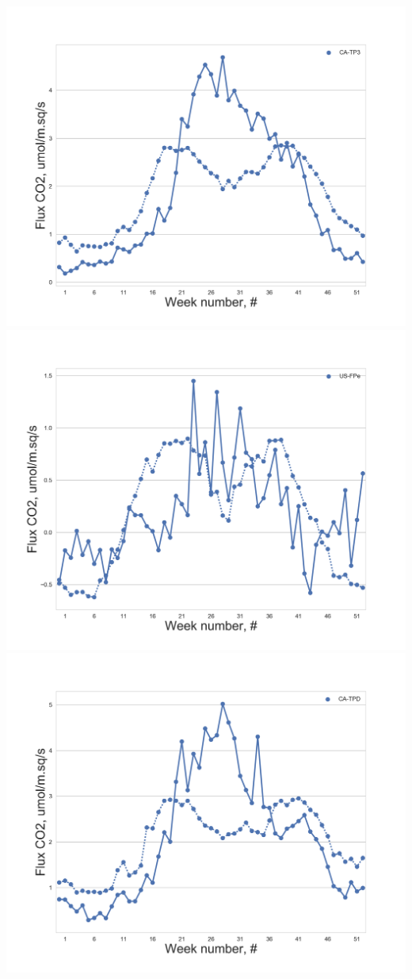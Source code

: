 \documentclass{beamer}
\begin{document}
\begin{frame}
\begin{columns}[t]
\centering
\includegraphics[width=\textwidth]{Reverse_engin_only_T/20.png}\\
\includegraphics[width=\textwidth]{Reverse_engin_only_T/23.png}
\centering
\includegraphics[width=\textwidth]{Reverse_engin_only_T/22.png}\\

\end{columns}
\end{frame}
\end{document}
